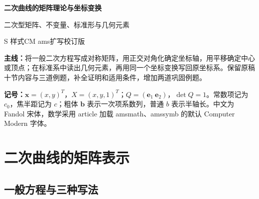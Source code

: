 \documentclass[11pt,a4paper]{article}
\begin{document}
\begin{center}{\LARGE\bfseries 二次曲线的矩阵理论与坐标变换\par}\vspace{7pt}
{\large 二次型矩阵、不变量、标准形与几何元素\par}\vspace{5pt}
{S 样式\qquad CM ams\qquad 扩写校订版}\end{center}
\textbf{主线：}将一般二次方程写成对称矩阵，用正交对角化确定坐标轴，用平移确定中心或顶点；在标准系中读出几何元素，再用同一个坐标变换写回原坐标系。保留原稿十节内容与三道例题，补全证明和适用条件，增加两道巩固例题。
\begin{center}
\end{center}
\textbf{记号：}$\boldsymbol x=(x,y)^T$，$X=(x,y,1)^T$；$Q=(\boldsymbol e_1\ \boldsymbol e_2)$，$\det Q=1$。常数项记为 $c_0$，焦半距记为 $c$；粗体 $\boldsymbol b$ 表示一次项系数列，普通 $b$ 表示半轴长。中文为 Fandol 宋体，数学采用 article 加载 amsmath、amssymb 的默认 Computer Modern 字体。
\begingroup\small\setlength{\parskip}{0pt}\tableofcontents\endgroup
\newpage
{}\section{二次曲线的矩阵表示}\label{ux4e8cux6b21ux66f2ux7ebfux7684ux77e9ux9635ux8868ux793a}

\subsection{一般方程与三种写法}\label{ux4e00ux822cux65b9ux7a0bux4e0eux4e09ux79cdux5199ux6cd5}
\end{document}
